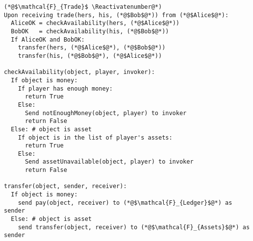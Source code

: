\Suppressnumber
\begin{lstlisting}[label=tradefunc, style=numbers]
(*@$\mathcal{F}_{Trade}$ \Reactivatenumber@*)
Upon receiving trade(hers, his, (*@$Bob$@*)) from (*@$Alice$@*):
  AliceOK = checkAvailability(hers, (*@$Alice$@*))
  BobOK   = checkAvailability(his, (*@$Bob$@*))
  If AliceOK and BobOK:
    transfer(hers, (*@$Alice$@*), (*@$Bob$@*))
    transfer(his, (*@$Bob$@*), (*@$Alice$@*))

checkAvailability(object, player, invoker):
  If object is money:
    If player has enough money:
      return True
    Else:
      Send notEnoughMoney(object, player) to invoker
      return False
  Else: # object is asset
    If object is in the list of player's assets:
      return True
    Else:
      Send assetUnavailable(object, player) to invoker
      return False

transfer(object, sender, receiver):
  If object is money:
    send pay(object, receiver) to (*@$\mathcal{F}_{Ledger}$@*) as sender
  Else: # object is asset
    send transfer(object, receiver) to (*@$\mathcal{F}_{Assets}$@*) as sender
\end{lstlisting}
